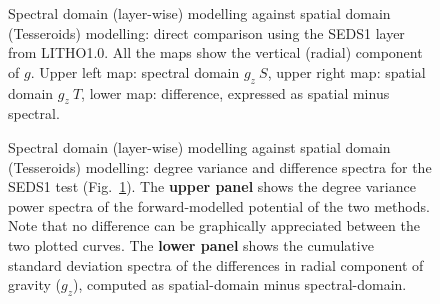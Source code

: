 \begin{subappendices}
\begin{figure} %
    \begin{adjustbox}{center}
    \end{adjustbox}
    \caption[Spectral domain modelling against spatial domain modelling: SEDS1 test, direct comparison of $g_z$.]{Spectral domain (layer-wise) modelling against spatial domain (Tesseroids) modelling: direct comparison using the {SEDS1} layer from {LITHO1.0}.
    All the maps show the vertical (radial) component of $g$.
    Upper left map: spectral domain $g_z \ S$, upper right map: spatial domain $g_z \ T$, lower map: difference, expressed as spatial minus spectral.}
    \label{fig:SpatSpecComp:SEDS1_g_maps}
\end{figure}

\begin{figure} %
    \begin{adjustbox}{center}
    \end{adjustbox}
    \caption[Spectral domain modelling against spatial domain modelling: degree variance and difference spectra (SEDS1 test).]{
        Spectral domain (layer-wise) modelling against spatial domain (Tesseroids) modelling: degree variance and difference spectra for the SEDS1 test (Fig.~\ref{fig:SpatSpecComp:SEDS1_g_maps}).
        The \textbf{upper panel} shows the degree variance power spectra of the forward-modelled potential of the two methods.
        Note that no difference can be graphically appreciated between the two plotted curves.
        The \textbf{lower panel} shows the cumulative standard deviation spectra of the differences in radial component of gravity ($g_z$), computed as spatial-domain minus spectral-domain.
    }
    \label{fig:SpatSpecComp:SEDS1_dv_spec}
\end{figure}


\end{subappendices}
